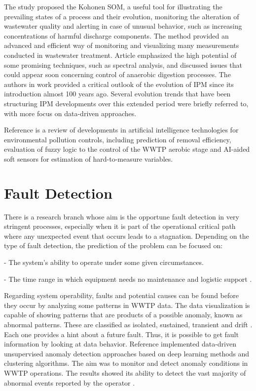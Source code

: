 The study \cite{Liukkonen2013} proposed the Kohonen \ac{SOM}, a useful tool for illustrating the prevailing states of a process and their evolution, monitoring the alteration of wastewater quality and alerting in case of unusual behavior, such as increasing concentrations of harmful discharge components. The method provided an advanced and efficient way of monitoring and visualizing many measurements conducted in wastewater treatment. Article \cite{Jimenez2015} emphasized the high potential of some promising techniques, such as spectral analysis, and discussed issues that could appear soon concerning control of anaerobic digestion  processes. The authors in work \cite{Reis2017} provided a critical outlook of the evolution of \ac{IPM} since its introduction almost 100 years ago. Several evolution trends that have been structuring \ac{IPM} developments over this extended period were briefly referred to, with more focus on data-driven approaches.

Reference \cite{Ye2020} is a review of developments in artificial intelligence technologies for environmental pollution controls, including prediction of removal efficiency, evaluation of fuzzy logic to the control of the \ac{WWTP} aerobic stage and \ac{AI}-aided soft sensors for estimation of hard-to-measure variables. 

\section{Fault Detection}
\label{s:RelatedWorks-faultDetection}

There is a research branch whose aim is the opportune fault detection in very stringent processes, especially when it is part of the operational critical path where any unexpected event that occurs leads to a stagnation. Depending on the type of fault detection, the prediction of the problem can be focused on:

- The system’s ability to operate under some given circumstances.

- The time range in which equipment needs no maintenance and logistic support \cite{Alsina2018}.

Regarding system operability, faults and potential causes can be found before they occur by analyzing some patterns in \ac{WWTP} data. The data visualization is capable of showing patterns that are products of a possible anomaly, known as abnormal patterns. These are classified as isolated, sustained, transient and drift \cite{Newhart2019}. Each one provides a hint about a future fault. Thus, it is possible to get fault information by looking at data behavior. Reference \cite{Dairi2019} implemented data-driven unsupervised anomaly detection approaches based on deep learning methods and clustering algorithms. The aim was to monitor and detect anomaly conditions in \ac{WWTP} operations. The results showed its ability to detect the vast majority of abnormal events reported by the operator \cite{Dairi2019}. 

